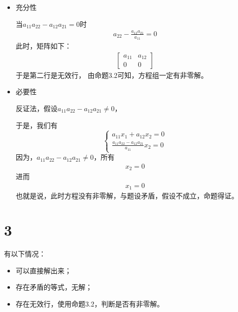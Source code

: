 \documentclass{article}
\begin{document}
\begin{itemize}

  \item 充分性

        当$a_{11}a_{22} - a_{12} a_{21} = 0$时
        \begin{align*}
          a_{22} - \frac{a_{12} a_{21}}{a_{11}} = 0
        \end{align*}
        此时，矩阵如下：
        \begin{align*}
          \begin{bmatrix}
            a_{11} & a_{12} \\
            0      & 0
          \end{bmatrix}
        \end{align*}
        于是第二行是无效行，
        由命题3.2可知，方程组一定有非零解。

  \item 必要性

        反证法，假设$a_{11}a_{22} - a_{12} a_{21} \neq 0$，

        于是，我们有
        \begin{equation*}
          \begin{cases*}
            a_{11}x_1 + a_{12}x_2 = 0 \\
            \frac{a_{11}a_{22} - a_{12} a_{21}}{a_{11}} x_2 = 0
          \end{cases*}
        \end{equation*}
        因为，$a_{11}a_{22} - a_{12} a_{21} \neq 0$，所有
        \begin{align*}
          x_2 = 0
        \end{align*}
        进而
        \begin{align*}
          x_1 = 0
        \end{align*}
        也就是说，此时方程没有非零解，与题设矛盾，假设不成立，命题得证。

\end{itemize}

\section*{3}

有以下情况：
\begin{itemize}
  \item 可以直接解出来；
  \item 存在矛盾的等式，无解；
  \item 存在无效行，使用命题3.2，判断是否有非零解。
\end{itemize}
\end{document}
